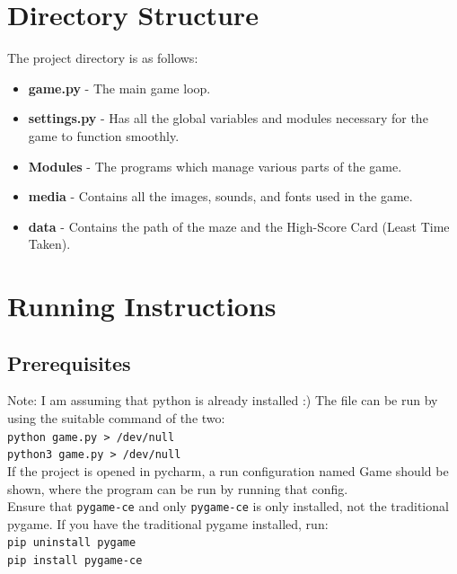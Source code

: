 \documentclass[10pt]{article}
\begin{document}
    \section{Directory Structure}\label{sec:directory-structure}
    The project directory is as follows:




    \begin{itemize}
        \item \textbf{game.py} - The main game loop.
        \item \textbf{settings.py} - Has all the global variables and modules necessary for the game to function smoothly.
        \item \textbf{Modules} - The programs which manage various parts of the game.
        \item \textbf{media} - Contains all the images, sounds, and fonts used in the game.
        \item \textbf{data} - Contains the path of the maze and the High-Score Card (Least Time Taken).
    \end{itemize}


    \section{Running Instructions}\label{sec:running-instructions}

    \subsection{Prerequisites}\label{subsec:prerequisites)}
    Note: I am assuming that python is already installed :)
    The file can be run by using the suitable command of the two: \\
    \texttt{python game.py > /dev/null} \\
    \texttt{python3 game.py > /dev/null} \\
    If the project is opened in pycharm, a run configuration named Game should be shown, where the program can be run by running that config.\\
    Ensure that \texttt{pygame-ce} and only \texttt{pygame-ce} is only installed, not the traditional pygame.
    If you have the traditional pygame installed, run: \\
    \texttt{pip uninstall pygame} \\
    \texttt{pip install pygame-ce}
\end{document}
